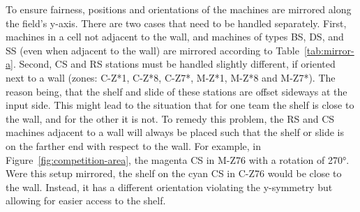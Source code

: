 \documentclass[12pt,twoside]{article}
\newcommand{\reffig}[1]{Figure~\ref{#1}}
\newcommand{\reftab}[1]{Table~\ref{#1}}
\begin{document}
To ensure fairness, positions and orientations of the machines are mirrored
along the field's y-axis. There are two cases that need to be handled
separately. First, machines in a cell not adjacent to the wall, and machines of
types BS, DS, and SS (even when adjacent to the wall) are mirrored according to
\reftab{tab:mirror-a}. Second, CS and RS stations must be handled slightly
different, if oriented next to a wall (zones: C-Z*1, C-Z*8, C-Z7*, M-Z*1, M-Z*8
and M-Z7*). The reason being, that the shelf and slide of these stations are
offset sideways at the input side. This might lead to the situation that for one
team the shelf is close to the wall, and for the other it is not. To remedy this
problem, the RS and CS machines adjacent to a wall will always be placed such
that the shelf or slide is on the farther end with respect to the wall. For
example, in \reffig{fig:competition-area}, the magenta CS in M-Z76 with a
rotation of \ang{270}. Were this setup mirrored, the shelf on the cyan CS in
C-Z76 would be close to the wall. Instead, it has a different orientation
violating the y-symmetry but allowing for easier access to the shelf.
\end{document}
